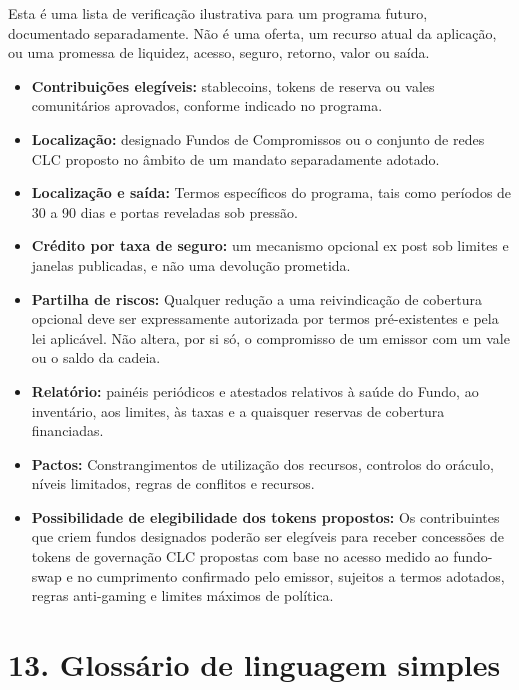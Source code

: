 \documentclass[11pt]{article}
\begin{document}
Esta é uma lista de verificação ilustrativa para um programa futuro, documentado separadamente. Não é uma oferta, um recurso atual da aplicação, ou uma promessa de liquidez, acesso, seguro, retorno, valor ou saída.

\begin{itemize}[leftmargin=*]
\item \textbf{Contribuições elegíveis:} stablecoins, tokens de reserva ou vales comunitários aprovados, conforme indicado no programa.
\item \textbf{Localização:} designado Fundos de Compromissos ou o conjunto de redes CLC proposto no âmbito de um mandato separadamente adotado.
\item \textbf{Localização e saída:} Termos específicos do programa, tais como períodos de 30 a 90 dias e portas reveladas sob pressão.
\item \textbf{Crédito por taxa de seguro:} um mecanismo opcional ex post sob limites e janelas publicadas, e não uma devolução prometida.
\item \textbf{Partilha de riscos:} Qualquer redução a uma reivindicação de cobertura opcional deve ser expressamente autorizada por termos pré-existentes e pela lei aplicável. Não altera, por si só, o compromisso de um emissor com um vale ou o saldo da cadeia.
\item \textbf{Relatório:} painéis periódicos e atestados relativos à saúde do Fundo, ao inventário, aos limites, às taxas e a quaisquer reservas de cobertura financiadas.
\item \textbf{Pactos:} Constrangimentos de utilização dos recursos, controlos do oráculo, níveis limitados, regras de conflitos e recursos.
\item \textbf{Possibilidade de elegibilidade dos tokens propostos:} Os contribuintes que criem fundos designados poderão ser elegíveis para receber concessões de tokens de governação CLC propostas com base no acesso medido ao fundo-swap e no cumprimento confirmado pelo emissor, sujeitos a termos adotados, regras anti-gaming e limites máximos de política.
\end{itemize}


\section*{13. Glossário de linguagem simples}
\end{document}
